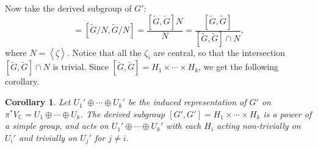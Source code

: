 \documentclass[12pt]{amsart}
\newcommand{\C}{\mathbb{C}}
\newcommand{\wt}{\widetilde}
\newtheorem{corollary}[theorem]{Corollary}
\theoremstyle{definition}
\newtheorem{example}[theorem]{Example}
\numberwithin{equation}{section}
\begin{document}


Now take the derived subgroup of \(G'\):
\begin{equation*}
    [G', G'] = [\wt{G}/N, \wt{G}/N] = \frac{[\wt{G}, \wt{G}] N}{N} = 
    \frac{[\wt{G}, \wt{G}]}{[\wt{G}, \wt{G}] \cap N},
\end{equation*}
where \(N = \left<\underline{\zeta}\right>\). Notice that all the \(\zeta_i\) are 
central, so that the intersection \([\wt{G}, \wt{G}] \cap N\) is trivial. Since 
\([\wt{G}, \wt{G}] = H_1 \times \cdots \times H_k\), we get the following corollary.


\begin{corollary}
    Let \(U_1' \oplus \cdots \oplus U_k'\) be the induced representation of \(G'\)
    on \(\pi^* V_\C = U_1 \oplus \cdots \oplus U_k\). 
    The derived subgroup \([G', G'] = H_1 \times \cdots \times H_k\) is a 
    power of a simple group, and acts on 
    \(U_1' \oplus \cdots \oplus U_k'\) with each \(H_i\) acting non-trivially
    on \(U_i'\) and trivially on \(U_j'\) for \(j \neq i\). 
\end{corollary}
\end{document}
